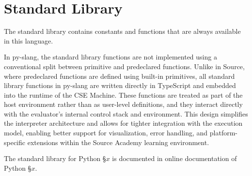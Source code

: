\section{Standard Library}

The standard library contains constants and functions that are 
always available in this language. 

In py-slang, the standard library functions are not implemented 
using a conventional split between primitive and predeclared 
functions. Unlike in Source, where predeclared functions are 
defined using built-in primitives, all standard library functions 
in py-slang are written directly in TypeScript and embedded into 
the runtime of the CSE Machine. These functions are treated as 
part of the host environment rather than as user-level definitions, 
and they interact directly with the evaluator's internal control 
stack and environment. This design simplifies the interpreter 
architecture and allows for tighter integration with the execution 
model, enabling better support for visualization, error handling, 
and platform-specific extensions within the Source Academy learning 
environment.

The standard library for Python \S $x$ is documented in online 
documentation of Python \S $x$.
